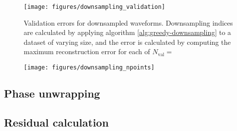 \documentclass[main.tex]{subfiles}
\begin{document}
\begin{figure}[ht]
\centering
\texttt{[image: figures/downsampling\_validation]}
\caption{Validation errors for downsampled waveforms. Downsampling indices are calculated by applying algorithm \ref{alg:greedy-downsampling} to a dataset of varying size, and the error is calculated by computing the maximum reconstruction error for each of \(N _{\text{val}} = \)}
\label{fig:downsampling_validation}
\end{figure}

\begin{figure}[ht]
\centering
\texttt{[image: figures/downsampling\_npoints]}
\caption{}
\label{fig:downsampling_npoints}
\end{figure}

\subsection{Phase unwrapping} \label{sec:unwrapping}

\subsection{Residual calculation} \label{sec:residuals}






\end{document}
